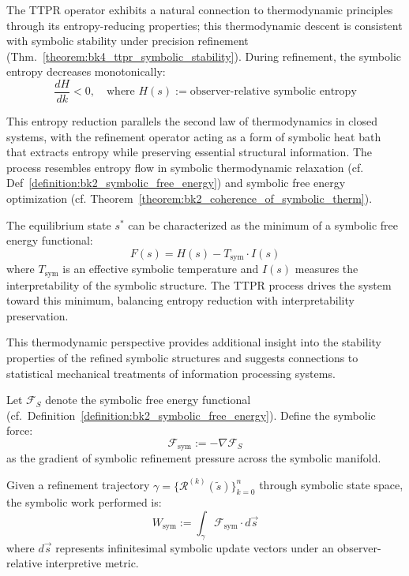 \begin{remark}
\label{remark:bk4_ttpr_entropy}
The TTPR operator exhibits a natural connection to thermodynamic principles through its entropy-reducing properties; this thermodynamic descent is consistent with symbolic stability under precision refinement (Thm.~\ref{theorem:bk4_ttpr_symbolic_stability}). During refinement, the symbolic entropy decreases monotonically:
\[
\frac{dH}{dk} < 0, \quad \text{where } H(s) := \text{observer-relative symbolic entropy}
\]

This entropy reduction parallels the second law of thermodynamics in closed systems, with the refinement operator acting as a form of symbolic heat bath that extracts entropy while preserving essential structural information. The process resembles entropy flow in symbolic thermodynamic relaxation (cf. Def~\ref{definition:bk2_symbolic_free_energy}) and symbolic free energy optimization (cf. Theorem~\ref{theorem:bk2_coherence_of_symbolic_therm}).

The equilibrium state $s^*$ can be characterized as the minimum of a symbolic free energy functional:
\[
F(s) = H(s) - T_{\text{sym}} \cdot I(s)
\]
where $T_{\text{sym}}$ is an effective symbolic temperature and $I(s)$ measures the interpretability of the symbolic structure. The TTPR process drives the system toward this minimum, balancing entropy reduction with interpretability preservation.

This thermodynamic perspective provides additional insight into the stability properties of the refined symbolic structures and suggests connections to statistical mechanical treatments of information processing systems.
\end{remark}

\begin{definition}
\label{definition:bk4_symbolic_work_functional}
Let \( \mathcal{F}_S \) denote the symbolic free energy functional (cf.~Definition~\ref{definition:bk2_symbolic_free_energy}). Define the symbolic force:
\[
\mathcal{F}_{\text{sym}} := -\nabla \mathcal{F}_S
\]
as the gradient of symbolic refinement pressure across the symbolic manifold.

Given a refinement trajectory \( \gamma = \{\mathcal{R}^{(k)}(\tilde{s})\}_{k=0}^{n} \) through symbolic state space, the symbolic work performed is:
\[
W_{\text{sym}} := \int_{\gamma} \mathcal{F}_{\text{sym}} \cdot d\vec{s}
\]
where \( d\vec{s} \) represents infinitesimal symbolic update vectors under an observer-relative interpretive metric.
\end{definition}

